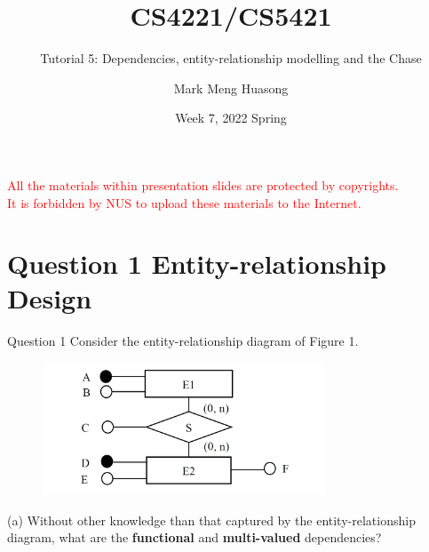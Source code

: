 \title{CS4221/CS5421}

\subtitle{Tutorial 5: Dependencies, entity-relationship modelling and the Chase}

\author{Mark Meng Huasong}



\date{Week 7, 2022 Spring}

\begin{frame}
	\titlepage
	\begin{tcolorbox}
		\begin{center}
			{\scriptsize \textcolor{red}{All the materials within presentation slides are protected by copyrights.\\
					It is forbidden by NUS to upload these materials to the Internet.}}
		\end{center}
	\end{tcolorbox}
\end{frame}

\section*{Question 1 Entity-relationship Design}

\begin{frame}[fragile]{Question 1}
Consider the entity-relationship diagram of Figure 1.
\begin{figure}
	\includegraphics[width=0.75\textwidth, trim=0 0 0 0, clip]{4221-t5/images/q1.png}
\end{figure}
(a) Without other knowledge than that captured by the entity-relationship diagram, what are the \textbf{functional} and \textbf{multi-valued} dependencies?
\end{frame}

